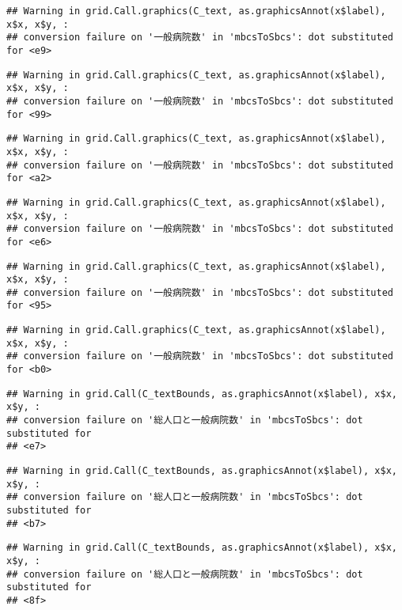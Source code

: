 \documentclass[
]{article}
\begin{document}
\begin{verbatim}
## Warning in grid.Call.graphics(C_text, as.graphicsAnnot(x$label), x$x, x$y, :
## conversion failure on '一般病院数' in 'mbcsToSbcs': dot substituted for <e9>
\end{verbatim}

\begin{verbatim}
## Warning in grid.Call.graphics(C_text, as.graphicsAnnot(x$label), x$x, x$y, :
## conversion failure on '一般病院数' in 'mbcsToSbcs': dot substituted for <99>
\end{verbatim}

\begin{verbatim}
## Warning in grid.Call.graphics(C_text, as.graphicsAnnot(x$label), x$x, x$y, :
## conversion failure on '一般病院数' in 'mbcsToSbcs': dot substituted for <a2>
\end{verbatim}

\begin{verbatim}
## Warning in grid.Call.graphics(C_text, as.graphicsAnnot(x$label), x$x, x$y, :
## conversion failure on '一般病院数' in 'mbcsToSbcs': dot substituted for <e6>
\end{verbatim}

\begin{verbatim}
## Warning in grid.Call.graphics(C_text, as.graphicsAnnot(x$label), x$x, x$y, :
## conversion failure on '一般病院数' in 'mbcsToSbcs': dot substituted for <95>
\end{verbatim}

\begin{verbatim}
## Warning in grid.Call.graphics(C_text, as.graphicsAnnot(x$label), x$x, x$y, :
## conversion failure on '一般病院数' in 'mbcsToSbcs': dot substituted for <b0>
\end{verbatim}

\begin{verbatim}
## Warning in grid.Call(C_textBounds, as.graphicsAnnot(x$label), x$x, x$y, :
## conversion failure on '総人口と一般病院数' in 'mbcsToSbcs': dot substituted for
## <e7>
\end{verbatim}

\begin{verbatim}
## Warning in grid.Call(C_textBounds, as.graphicsAnnot(x$label), x$x, x$y, :
## conversion failure on '総人口と一般病院数' in 'mbcsToSbcs': dot substituted for
## <b7>
\end{verbatim}

\begin{verbatim}
## Warning in grid.Call(C_textBounds, as.graphicsAnnot(x$label), x$x, x$y, :
## conversion failure on '総人口と一般病院数' in 'mbcsToSbcs': dot substituted for
## <8f>
\end{verbatim}
\end{document}
